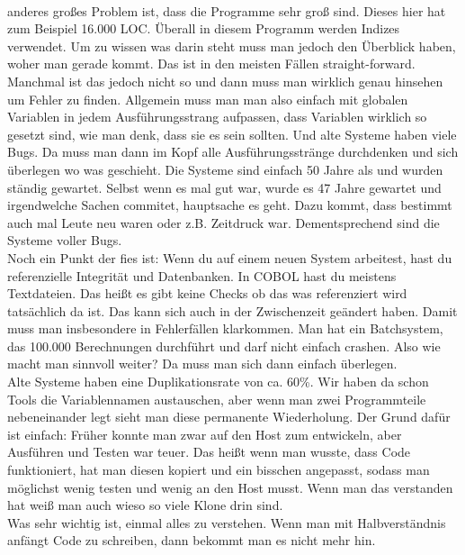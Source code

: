 {\\
anderes großes Problem ist, dass die Programme sehr groß sind. Dieses hier hat zum Beispiel 16.000 LOC. Überall in diesem Programm werden Indizes verwendet. Um zu wissen was darin steht muss man jedoch den Überblick haben, woher man gerade kommt. Das ist in den meisten Fällen straight-forward. Manchmal ist das jedoch nicht so und dann muss man wirklich genau hinsehen um Fehler zu finden. Allgemein muss man man also einfach mit globalen Variablen in jedem Ausführungsstrang aufpassen, dass Variablen wirklich so gesetzt sind, wie man denk, dass sie es sein sollten. Und alte Systeme haben viele Bugs. Da muss man dann im Kopf alle Ausführungsstränge durchdenken und sich überlegen wo was geschieht. Die Systeme sind einfach 50 Jahre als und wurden ständig gewartet. Selbst wenn es mal gut war, wurde es 47 Jahre gewartet und irgendwelche Sachen commitet, hauptsache es geht. Dazu kommt, dass bestimmt auch mal Leute neu waren oder z.B. Zeitdruck war. Dementsprechend sind die Systeme voller Bugs. 
\\
Noch ein Punkt der fies ist: Wenn du auf einem neuen System arbeitest, hast du referenzielle Integrität und Datenbanken. In COBOL hast du meistens Textdateien. Das heißt es gibt keine Checks ob das was referenziert wird tatsächlich da ist. Das kann sich auch in der Zwischenzeit geändert haben. Damit muss man insbesondere in Fehlerfällen klarkommen. Man hat ein Batchsystem, das 100.000 Berechnungen durchführt und darf nicht einfach crashen. Also wie macht man sinnvoll weiter? Da muss man sich dann einfach überlegen. 
\\
Alte Systeme haben eine Duplikationsrate von ca. 60\%. Wir haben da schon Tools die Variablennamen austauschen, aber wenn man zwei Programmteile nebeneinander legt sieht man diese permanente Wiederholung. Der Grund dafür ist einfach: Früher konnte man zwar auf den Host zum entwickeln, aber Ausführen und Testen war teuer. Das heißt wenn man wusste, dass Code funktioniert, hat man diesen kopiert und ein bisschen angepasst, sodass man möglichst wenig testen und wenig an den Host musst. Wenn man das verstanden hat weiß man auch wieso so viele Klone drin sind. 
\\
Was sehr wichtig ist, einmal alles zu verstehen. Wenn man mit Halbverständnis anfängt Code zu schreiben, dann bekommt man es nicht mehr hin. 
}


